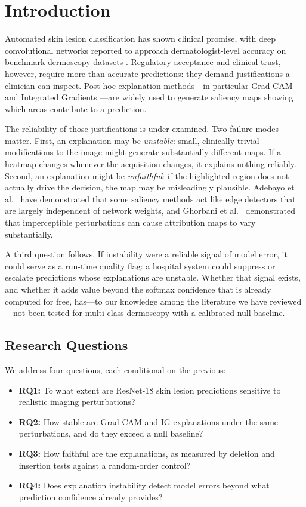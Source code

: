 \documentclass[conference]{IEEEtran}
\begin{document}
\section{Introduction}

Automated skin lesion classification has shown clinical promise, with deep
convolutional networks reported to approach dermatologist-level accuracy on
benchmark dermoscopy datasets \cite{esteva2017}. Regulatory acceptance and
clinical trust, however, require more than accurate predictions: they demand
justifications a clinician can inspect. Post-hoc explanation
methods---in particular Grad-CAM \cite{selvaraju2017} and Integrated
Gradients \cite{sundararajan2017}---are widely used to generate saliency maps
showing which areas contribute to a prediction.

The reliability of those justifications is under-examined. Two failure modes
matter. First, an explanation may be \emph{unstable}: small, clinically
trivial modifications to the image might generate substantially different maps. If
a heatmap changes whenever the acquisition changes, it explains nothing
reliably. Second, an explanation might be \emph{unfaithful}: if the highlighted
region does not actually drive the decision, the map may be misleadingly
plausible. Adebayo et al.\ \cite{adebayo2018} have demonstrated that some saliency
methods act like edge detectors that are largely independent of network weights,
and Ghorbani et al.\ \cite{ghorbani2019} demonstrated that imperceptible
perturbations can cause attribution maps to vary substantially.

A third question follows. If instability were a reliable
signal of model error, it could serve as a run-time quality flag: a
hospital system could suppress or escalate predictions whose explanations
are unstable. Whether that signal exists, and whether it adds value beyond
the softmax confidence that is already computed for free, has---to our knowledge
among the literature we have reviewed---not been tested for multi-class
dermoscopy with a calibrated null baseline.

\subsection{Research Questions}
We address four questions, each conditional on the previous:
\begin{itemize}
\item \textbf{RQ1:} To what extent are ResNet-18 skin lesion predictions
sensitive to realistic imaging perturbations?
\item \textbf{RQ2:} How stable are Grad-CAM and IG explanations under the
same perturbations, and do they exceed a null baseline?
\item \textbf{RQ3:} How faithful are the explanations, as measured by
deletion and insertion tests against a random-order control?
\item \textbf{RQ4:} Does explanation instability detect model errors beyond
what prediction confidence already provides?
\end{itemize}
\end{document}
